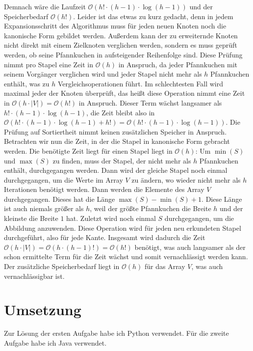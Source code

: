 \documentclass[a4paper,10pt,ngerman]{scrartcl}
\begin{document}
Demnach wäre die Laufzeit $\mathcal{O}(h! \cdot (h-1) \cdot \log (h-1))$ und der Speicherbedarf $\mathcal{O}(h!)$. Leider ist das etwas zu kurz gedacht, denn
in jedem Expansionsschritt des Algorithmus muss für jeden neuen Knoten noch die kanonische Form gebildet werden. Außerdem kann der zu erweiternde Knoten nicht direkt
mit einem Zielknoten verglichen werden, sondern es muss geprüft werden, ob seine Pfannkuchen in aufsteigender Reihenfolge sind. Diese Prüfung nimmt pro Stapel eine Zeit in
$\mathcal{O}(h)$ in Anspruch, da jeder Pfannkuchen mit seinem Vorgänger verglichen wird und jeder Stapel nicht mehr als $h$ Pfannkuchen enthält, was zu $h$ Vergleichsoperationen führt.
Im schlechtesten Fall wird maximal jeder der Knoten überprüft, das heißt diese Operation nimmt eine Zeit in $\mathcal{O}(h \cdot |V|) = \mathcal{O}(h!)$ in Anspruch. Dieser Term
wächst langsamer als $h! \cdot (h-1) \cdot \log (h-1)$, die Zeit bleibt also in $\mathcal{O}(h! \cdot (h-1) \cdot \log (h-1) + h!) = \mathcal{O}(h! \cdot (h-1) \cdot \log (h-1))$. Die
Prüfung auf Sortiertheit nimmt keinen zusätzlichen Speicher in Anspruch.\\
Betrachten wir nun die Zeit, in der die Stapel in kanonische Form gebracht werden. Die benötigte Zeit liegt für einen Stapel liegt in $\mathcal{O}(h)$: Um $\min(S)$ und $\max(S)$ zu finden, muss der 
Stapel, der nicht mehr als $h$ Pfannkuchen enthält, durchgegangen werden. Dann wird der gleiche Stapel noch einmal durchgegangen, um die Werte im Array $V$ zu ändern, wo wieder nicht mehr als
$h$ Iterationen benötigt werden. Dann werden die Elemente des Array $V$ durchgegangen. Dieses hat die Länge $\max(S) - \min(S) + 1$. Diese Länge ist auch niemals größer als $h$, weil 
der größte Pfannkuchen die Breite $h$ und der kleinste die Breite $1$ hat. Zuletzt wird noch einmal $S$ durchgegangen, um die Abbildung anzuwenden. Diese Operation wird für jeden neu
erkundeten Stapel durchgeführt, also für jede Kante. Insgesamt wird dadurch die Zeit $\mathcal{O}(h \cdot |V|) = \mathcal{O}(h \cdot (h-1)!) = \mathcal{O}(h!)$ benötigt, was auch langsamer
als der schon ermittelte Term für die Zeit wächst und somit vernachlässigt werden kann. Der zusätzliche Speicherbedarf liegt in $\mathcal{O}(h)$ für das Array $V$, was auch vernachlässigbar ist.
\section{Umsetzung}
Zur Lösung der ersten Aufgabe habe ich Python verwendet. Für die zweite Aufgabe
habe ich Java verwendet.
\end{document}
